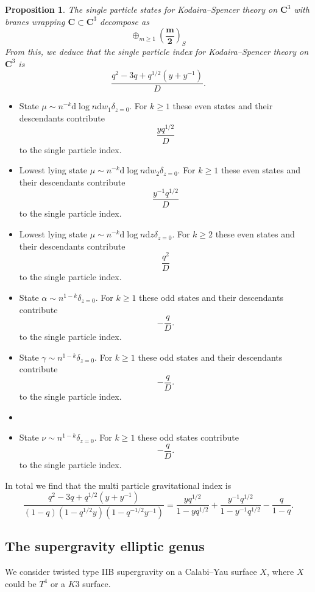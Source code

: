\documentclass[11pt]{amsart}
\newcommand{\C}{\mathbf C}
\renewcommand{\d}{\mathrm{d}}
\newcommand\beqn{\begin{equation}}
\newcommand\eeqn{\end{equation}}
\theoremstyle{thm}
\newtheorem{prop}[theorem]{Proposition}
\numberwithin{equation}{subsection}
\theoremstyle{def}
\theoremstyle{rem}
\begin{document}
\begin{prop}
The single particle states for Kodaira--Spencer theory on $\C^3$ with branes wrapping $\C \subset \C^3$ decompose as
\beqn
\oplus_{m \geq 1} \left(\mathbf{\frac{m}{2}}\right)_S 
\eeqn
From this, we deduce that the single particle index for Kodaira--Spencer theory on $\C^3$ is
\beqn
\frac{q^2 - 3 q + q^{1/2}(y+y^{-1})}{D} .
\eeqn
\end{prop}

\begin{itemize} 
\item State $\mu \sim n^{-k} \d \log n \d w_1 \delta_{z=0}$.
For $k \geq 1$ these even states and their descendants contribute
\beqn
\frac{y q^{1/2}}{D} 
\eeqn
to the single particle index. 
\item Lowest lying state $\mu \sim n^{-k} \d \log n \d w_2 \delta_{z=0}$.
For $k \geq 1$ these even states and their descendants contribute
\beqn
\frac{y^{-1} q^{1/2}}{D} 
\eeqn
to the single particle index. 
\item Lowest lying state $\mu \sim n^{-k} \d \log n \d z \delta_{z=0}$.
For $k \geq 2$ these even states and their descendants contribute 
\beqn
\frac{q^2}{D} 
\eeqn
to the single particle index. 
\item State $\alpha \sim n^{1-k}\delta_{z=0}$. 
For $k \geq 1$ these odd states and their descendants contribute 
\beqn
- \frac{q}{D} .
\eeqn
to the single particle index.
\item State $\gamma \sim n^{1-k}\delta_{z=0}$. 
For $k \geq 1$ these odd states and their descendants contribute 
\beqn
- \frac{q}{D} .
\eeqn
to the single particle index.
\item \item State $\nu \sim n^{1-k}\delta_{z=0}$. 
For $k \geq 1$ these odd states contribute 
\beqn
- \frac{q}{D} .
\eeqn
to the single particle index.
\end{itemize}

In total we find that the multi particle gravitational index is 
\beqn
\frac{q^2 - 3q + q^{1/2} (y+y^{-1})}{(1-q)(1-q^{1/2} y)(1-q^{-1/2}y^{-1})} = \frac{y q^{1/2}}{1-y q^{1/2}} + \frac{y^{-1} q^{1/2}}{1-y^{-1}  q^{1/2}} - \frac{q}{1-q} .
\eeqn

\subsection{The supergravity elliptic genus} 

We consider twisted type IIB supergravity on a Calabi--Yau surface $X$, where $X$ could be $T^4$ or a $K3$ surface. 
\end{document}
